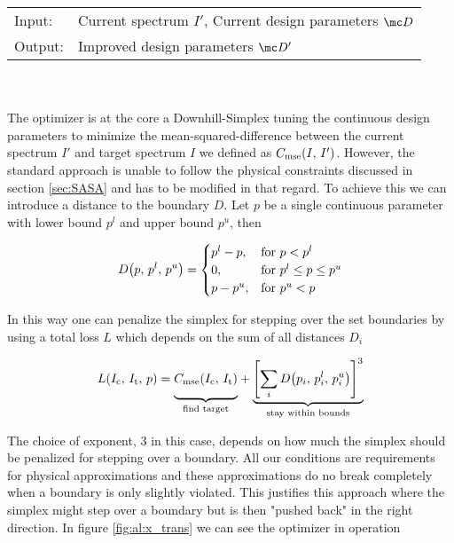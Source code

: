 \begin{tabular}{ll}
    \toprule
    Input: &
    Current spectrum $I'$, 
    Current design parameters $\mc D$\\
    Output: & 
    Improved design parameters $\mc D'$\\
    \bottomrule
\end{tabular}
\\
\\
The optimizer is at the core a Downhill-Simplex \cite{Nelder1965} tuning the continuous design parameters to minimize the mean-squared-difference between the current spectrum $I'$ and target spectrum $I$ we defined as 
$C_{\mathrm{mse}}\qty(I, \, I')$.
However, the standard approach is unable to follow the physical constraints discussed in section \ref{sec:SASA} and has to be modified in that regard. To achieve this we can introduce a distance to the boundary $D$. Let $p$ be a single continuous parameter with lower bound $p^l$ and upper bound $p^u$, then

\begin{equation}
    D\qty(p, \, p^l, \, p^u) =
    \begin{cases}
        p^l - p, & \text{for } p < p^l\\
        0, & \text{for } p^l \leq p \leq p^u\\
        p - p^u, & \text{for } p^u < p
    \end{cases}
\end{equation}

\noindent
In this way one can penalize the simplex for stepping over the set boundaries by using a total loss $L$ which depends on the sum of all distances $D_i$

\begin{equation}
    L(I_\s{c}, \,I_\s{t}, \,p) =
    {\underbrace{%
    \vphantom{ \left(\frac{a^{0.3}}{b}\right) }
    C_\s{mse}(I_\s{c}, \, I_\s{t})}_{\text{find target}}}
    +
    {\underbrace{%
    \qty[\sum_i D\qty(p_i, \, p_i^l, \, p_i^u)]^3
    }_{\text{stay within bounds}}}\\
\end{equation}

The choice of exponent, 3 in this case, depends on how much the simplex should be penalized for stepping over a boundary. All our conditions are requirements for physical approximations and these approximations do no break completely when a boundary is only slightly violated. This justifies this approach where the simplex might step over a boundary but is then "pushed back" in the right direction. In figure \ref{fig:al:x_trans} we can see the optimizer in operation
\\

